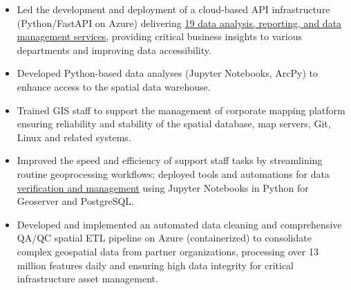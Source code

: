 \documentclass[letterpaper]{article}
\newenvironment{jobtasklist}
        {
            \vspace{-12pt}
            \begin{itemize} \itemsep 0pt
        }{
            \end{itemize}
            \vspace{-3pt}
        }
\newcommand{\impt}[1]{\uline{#1}}
\begin{document}
\begin{jobtasklist}
    \item Led the development and deployment of a cloud-based API infrastructure (Python/FastAPI on Azure)
            delivering \impt{19 data analysis, reporting, and data management services}, providing critical business insights
            to various departments and improving data accessibility.
    \item Developed Python-based data analyses (Jupyter Notebooks, ArcPy)
            to enhance access to the spatial data warehouse.
    \item Trained GIS staff to support the management of corporate mapping platform ensuring reliability
            and stability of the
            spatial database, map servers, Git, Linux and related systems.


    \item Improved the speed and efficiency of support staff tasks
            by streamlining routine geoprocessing workflows;
            deployed tools and automations for data \impt{verification and management} using
            Jupyter Notebooks in Python for Geoserver and PostgreSQL.
    \item Developed and implemented an automated data cleaning and comprehensive QA/QC spatial ETL pipeline
            on Azure (containerized) to consolidate complex geospatial data from partner organizations,
            processing over 13 million features daily and ensuring high data integrity
            for critical infrastructure asset management.

\end{jobtasklist}
\end{document}
